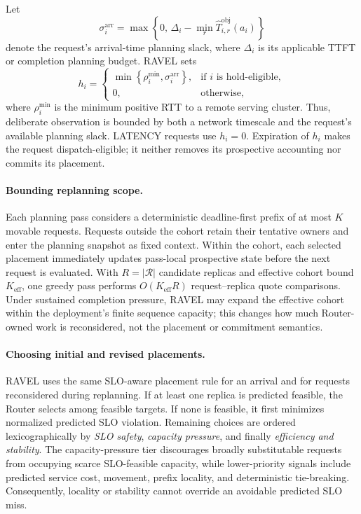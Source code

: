 Let
\[
\sigma_i^{\mathrm{arr}}
=
\max\!\left\{
0,\,
\Delta_i-
\min_r\widehat{T}^{\mathrm{obj}}_{i,r}(a_i)
\right\}
\]
denote the request's arrival-time planning slack, where $\Delta_i$ is its
applicable TTFT or completion planning budget.
RAVEL sets
\begin{equation}
    h_i
    =
    \begin{cases}
        \min\!\left\{
            \rho_i^{\min},
            \sigma_i^{\mathrm{arr}}
        \right\},
        & \text{if $i$ is hold-eligible},\\
        0,
        & \text{otherwise},
    \end{cases}
    \label{eq:ravel-mobility-hold}
\end{equation}
where $\rho_i^{\min}$ is the minimum positive RTT to a remote serving cluster.
Thus, deliberate observation is bounded by both a network timescale and the
request's available planning slack.
LATENCY requests use $h_i=0$.
Expiration of $h_i$ makes the request dispatch-eligible; it neither removes
its prospective accounting nor commits its placement.

\paragraph{Bounding replanning scope.}
Each planning pass considers a deterministic deadline-first prefix of at most
$K$ movable requests.
Requests outside the cohort retain their tentative owners and enter the
planning snapshot as fixed context.
Within the cohort, each selected placement immediately updates pass-local
prospective state before the next request is evaluated.
With $R=|\mathcal{R}|$ candidate replicas and effective cohort bound
$K_{\mathrm{eff}}$, one greedy pass performs
$O(K_{\mathrm{eff}}R)$ request--replica quote comparisons.
Under sustained completion pressure, RAVEL may expand the effective cohort
within the deployment's finite sequence capacity; this changes how much
Router-owned work is reconsidered, not the placement or commitment semantics.

\paragraph{Choosing initial and revised placements.}
RAVEL uses the same SLO-aware placement rule for an arrival and for requests
reconsidered during replanning.
If at least one replica is predicted feasible, the Router selects among
feasible targets.
If none is feasible, it first minimizes normalized predicted SLO violation.
Remaining choices are ordered lexicographically by
\emph{SLO safety}, \emph{capacity pressure}, and finally
\emph{efficiency and stability}.
The capacity-pressure tier discourages broadly substitutable requests from
occupying scarce SLO-feasible capacity, while lower-priority signals include
predicted service cost, movement, prefix locality, and deterministic
tie-breaking.
Consequently, locality or stability cannot override an avoidable predicted
SLO miss.

